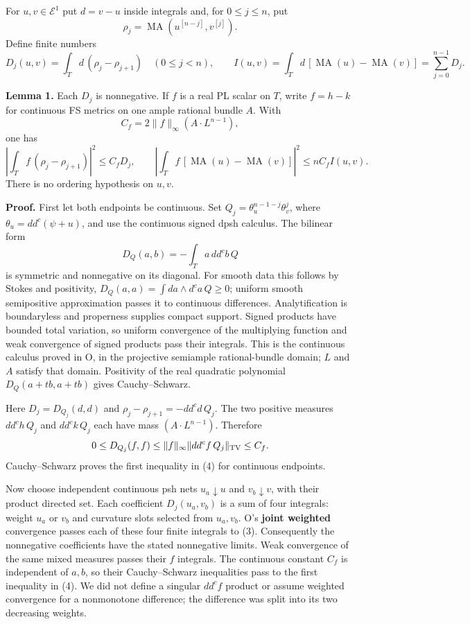 \documentclass[
  11pt,
]{article}
\begin{document}
For \(u,v\in\mathcal E^1\) put \(d=v-u\) inside integrals and, for
\(0\leq j\leq n\), put \[
 \rho_j=\operatorname{MA}(u^{[n-j]},v^{[j]}).
\] Define finite numbers \[
 D_j(u,v)=\int_Td\,(\rho_j-\rho_{j+1})\quad(0\leq j<n),
 \qquad I(u,v)=\int_Td\,[\operatorname{MA}(u)-\operatorname{MA}(v)]
             =\sum_{j=0}^{n-1}D_j.                             \tag{3}
\]

\textbf{Lemma 1.} Each \(D_j\) is nonnegative. If \(f\) is a real PL
scalar on \(T\), write \(f=h-k\) for continuous FS metrics on one ample
rational bundle \(A\). With \[
 C_f=2\|f\|_\infty(A\cdot L^{n-1}),
\] one has \[
 \left|\int_T f\,(\rho_j-\rho_{j+1})\right|^2\leq C_fD_j,
 \qquad
 \left|\int_Tf\,[\operatorname{MA}(u)-\operatorname{MA}(v)]\right|^2
       \leq nC_f I(u,v).                                      \tag{4}
\] There is no ordering hypothesis on \(u,v\).

\textbf{Proof.} First let both endpoints be continuous. Set
\(Q_j=\theta_u^{n-1-j}\theta_v^j\), where \(\theta_u=dd^c(\psi+u)\), and
use the continuous signed dpsh calculus. The bilinear form \[
 D_Q(a,b)=-\int_T a\,dd^cb\,Q
\] is symmetric and nonnegative on its diagonal. For smooth data this
follows by Stokes and positivity,
\(D_Q(a,a)=\int da\wedge d^ca\,Q\geq0\); uniform smooth semipositive
approximation passes it to continuous differences. Analytification is
boundaryless and properness supplies compact support. Signed products
have bounded total variation, so uniform convergence of the multiplying
function and weak convergence of signed products pass their integrals.
This is the continuous calculus proved in O, in the projective semiample
rational-bundle domain; \(L\) and \(A\) satisfy that domain. Positivity
of the real quadratic polynomial \(D_Q(a+tb,a+tb)\) gives
Cauchy--Schwarz.

Here \(D_j=D_{Q_j}(d,d)\) and \(\rho_j-\rho_{j+1}=-dd^cd\,Q_j\). The two
positive measures \(dd^ch\,Q_j\) and \(dd^ck\,Q_j\) each have mass
\((A\cdot L^{n-1})\). Therefore \[
 0\leq D_{Q_j}(f,f)
 \leq\|f\|_\infty\|dd^cf\,Q_j\|_{\rm TV}
 \leq C_f.
\] Cauchy--Schwarz proves the first inequality in (4) for continuous
endpoints.

Now choose independent continuous psh nets \(u_a\downarrow u\) and
\(v_b\downarrow v\), with their product directed set. Each coefficient
\(D_j(u_a,v_b)\) is a sum of four integrals: weight \(u_a\) or \(v_b\)
and curvature slots selected from \(u_a,v_b\). O's \textbf{joint
weighted} convergence passes each of these four finite integrals to (3).
Consequently the nonnegative coefficients have the stated nonnegative
limits. Weak convergence of the same mixed measures passes their \(f\)
integrals. The continuous constant \(C_f\) is independent of \(a,b\), so
their Cauchy--Schwarz inequalities pass to the first inequality in (4).
We did not define a singular \(dd^cf\) product or assume weighted
convergence for a nonmonotone difference; the difference was split into
its two decreasing weights.
\end{document}
